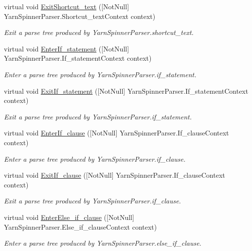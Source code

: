 \begin{DoxyCompactItemize}
virtual void \hyperlink{a00190_a26bb6f162b0375a1455013d85dff2ddb}{Exit\-Shortcut\-\_\-text} (\mbox{[}Not\-Null\mbox{]} Yarn\-Spinner\-Parser.\-Shortcut\-\_\-text\-Context context)
\begin{DoxyCompactList}\small\item\em Exit a parse tree produced by Yarn\-Spinner\-Parser.\-shortcut\-\_\-text. \end{DoxyCompactList}\item 
virtual void \hyperlink{a00190_a6a48fc449efd199d13ecacd410b815ad}{Enter\-If\-\_\-statement} (\mbox{[}Not\-Null\mbox{]} Yarn\-Spinner\-Parser.\-If\-\_\-statement\-Context context)
\begin{DoxyCompactList}\small\item\em Enter a parse tree produced by Yarn\-Spinner\-Parser.\-if\-\_\-statement. \end{DoxyCompactList}\item 
virtual void \hyperlink{a00190_ac9b0ce9a61afd12bc631e834adc38893}{Exit\-If\-\_\-statement} (\mbox{[}Not\-Null\mbox{]} Yarn\-Spinner\-Parser.\-If\-\_\-statement\-Context context)
\begin{DoxyCompactList}\small\item\em Exit a parse tree produced by Yarn\-Spinner\-Parser.\-if\-\_\-statement. \end{DoxyCompactList}\item 
virtual void \hyperlink{a00190_a94adce014a20de8b1a4b82b50d3e3036}{Enter\-If\-\_\-clause} (\mbox{[}Not\-Null\mbox{]} Yarn\-Spinner\-Parser.\-If\-\_\-clause\-Context context)
\begin{DoxyCompactList}\small\item\em Enter a parse tree produced by Yarn\-Spinner\-Parser.\-if\-\_\-clause. \end{DoxyCompactList}\item 
virtual void \hyperlink{a00190_ab9705313017584f8f466e481ae4cdcfc}{Exit\-If\-\_\-clause} (\mbox{[}Not\-Null\mbox{]} Yarn\-Spinner\-Parser.\-If\-\_\-clause\-Context context)
\begin{DoxyCompactList}\small\item\em Exit a parse tree produced by Yarn\-Spinner\-Parser.\-if\-\_\-clause. \end{DoxyCompactList}\item 
virtual void \hyperlink{a00190_a453eb5ea8f6e44280ab156b771821919}{Enter\-Else\-\_\-if\-\_\-clause} (\mbox{[}Not\-Null\mbox{]} Yarn\-Spinner\-Parser.\-Else\-\_\-if\-\_\-clause\-Context context)
\begin{DoxyCompactList}\small\item\em Enter a parse tree produced by Yarn\-Spinner\-Parser.\-else\-\_\-if\-\_\-clause. \end{DoxyCompactList}\item 

\end{DoxyCompactItemize}
